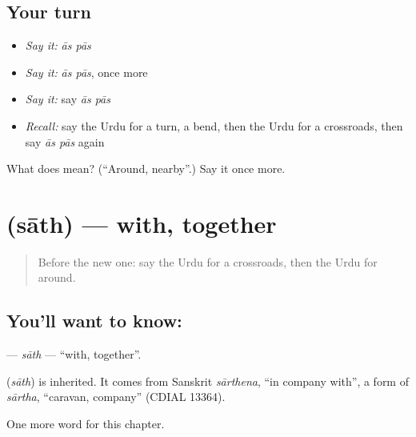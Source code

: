 \subsection*{Your turn}
\begin{itemize}
\raggedright
  \item \emph{Say it:} \emph{ās pās}
  \item \emph{Say it:} \emph{ās pās}, once more
  \item \emph{Say it:} say \emph{ās pās}
  \item \emph{Recall:} say the Urdu for a turn, a bend, then the Urdu for a crossroads, then say \emph{ās pās} again
\end{itemize}

\begin{tcolorbox}[breakable,colback=teal!4,colframe=teal!35!black,title={Before you move on}]
What does   mean? (\textquotedblleft{}Around, nearby\textquotedblright{}.) Say it once more.
\end{tcolorbox}
\section[\texorpdfstring{\ur{ساتھ} (sāth)}{ساتھ (sāth)}]{ (sāth) — with, together}

\label{lesson:UR-C100-sath}



\begin{quote}
Before the new one: say the Urdu for a crossroads, then the Urdu for around.
\end{quote}

\subsection*{You'll want to know: }
\textbf{} — \emph{sāth} — \textquotedblleft{}with, together\textquotedblright{}.

\begin{cousinweb}
\textbf{} (\emph{sāth}) is inherited. It comes from Sanskrit \emph{sārthena}, \textquotedblleft{}in company with\textquotedblright{}, a form of \emph{sārtha}, \textquotedblleft{}caravan, company\textquotedblright{} (CDIAL 13364).
\end{cousinweb}

\begin{grammarlens}[title={What you've built}]
One more word for this chapter.
\end{grammarlens}

